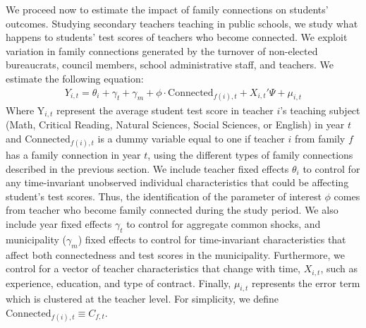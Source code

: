 \documentclass[12pt,runningheads]{article}
\begin{document}
We proceed now to estimate the impact of family connections on students' outcomes. Studying secondary teachers teaching in public schools, we study what happens to students' test scores of teachers who become connected. We exploit variation in family connections generated by the turnover of non-elected bureaucrats, council members, school administrative staff, and teachers. We estimate the following equation:
\begin{align}
Y_{i,t}= \theta_{i} +\gamma_t + \gamma_m +  \phi \cdot \text{Connected}_{f(i),t} +  X_{i,t}'\Psi + \mu_{i,t}
\label{equation:eq1}
\end{align}
Where $\text{Y}_{i,t}$ represent the average student test score in teacher $i$'s teaching subject (Math, Critical Reading, Natural Sciences, Social Sciences, or English) in year $t$ and $\text{Connected}_{f(i),t}$ is a dummy variable equal to one if teacher $i$ from family $f$ has a family connection in year $t$, using the different types of family connections described in the previous section. We include teacher fixed effects $\theta_{i}$ to control for any time-invariant unobserved individual characteristics that could be affecting student's test scores. Thus, the identification of the parameter of interest $\phi$ comes from teacher who become family connected during the study period. We also include year fixed effects $\gamma_t$ to control for aggregate common shocks, and municipality ($\gamma_m$) fixed effects to control for time-invariant characteristics that affect both connectedness and test scores in the municipality. Furthermore, we control for a vector of teacher characteristics that change with time, $X_{i,t}$, such as experience, education, and type of contract. Finally, $\mu_{i,t}$ represents the error term which is clustered at the teacher level. For simplicity, we define $\text{Connected}_{f(i),t} \equiv C_{f,t}$.
\end{document}
